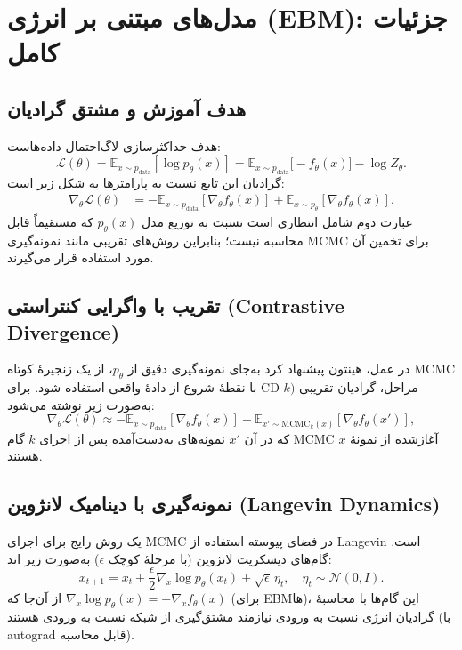


\section{مدل‌های مبتنی بر انرژی (EBM): جزئیات کامل}

\subsection{هدف آموزش و مشتق گرادیان}
هدف حداکثرسازی لاگ‌احتمال داده‌هاست:
\begin{equation}
\mathcal{L}(\theta)=\mathbb{E}_{x\sim p_{\text{data}}}[\log p_{\theta}(x)] = \mathbb{E}_{x\sim p_{\text{data}}}\big[-f_{\theta}(x)\big] - \log Z_{\theta}.
\end{equation}
گرادیان این تابع نسبت به پارامترها به شکل زیر است:
\begin{align}
\nabla_{\theta} \mathcal{L}(\theta) &= -\mathbb{E}_{x\sim p_{\text{data}}}[\nabla_{\theta} f_{\theta}(x)] + \mathbb{E}_{x\sim p_{\theta}}[\nabla_{\theta} f_{\theta}(x)].
\end{align}
عبارت دوم شامل انتظاری است نسبت به توزیع مدل \(p_{\theta}(x)\) که مستقیماً قابل محاسبه نیست؛ بنابراین روش‌های تقریبی مانند نمونه‌گیری MCMC برای تخمین آن مورد استفاده قرار می‌گیرند.

\subsection{تقریب با واگرایی کنتراستی (Contrastive Divergence)}
در عمل، هینتون پیشنهاد کرد به‌جای نمونه‌گیری دقیق از \(p_{\theta}\)، از یک زنجیرهٔ کوتاه MCMC با نقطهٔ شروع از دادهٔ واقعی استفاده شود. برای CD-\(k)\) مراحل، گرادیان تقریبی به‌صورت زیر نوشته می‌شود:
\begin{equation}
\nabla_{\theta} \mathcal{L}(\theta) \approx -\mathbb{E}_{x\sim p_{\text{data}}}[\nabla_{\theta} f_{\theta}(x)] + \mathbb{E}_{x'\sim \text{MCMC}_k(x)}[\nabla_{\theta} f_{\theta}(x')],
\end{equation}
که در آن \(x'\) نمونه‌های به‌دست‌آمده پس از اجرای \(k\) گام MCMC آغازشده از نمونهٔ \(x\) هستند.

\subsection{نمونه‌گیری با دینامیک لانژوین (Langevin Dynamics)}
یک روش رایج برای اجرای MCMC در فضای پیوسته استفاده از Langevin است. گام‌های دیسکریت لانژوین (با مرحلهٔ کوچک \(\epsilon\)) به‌صورت زیر اند:
\begin{equation}
x_{t+1} = x_t + \frac{\epsilon}{2} \nabla_x \log p_{\theta}(x_t) + \sqrt{\epsilon}\,\eta_t, \quad \eta_t \sim \mathcal{N}(0, I).
\end{equation}
از آن‌جا که \(\nabla_x \log p_{\theta}(x) = -\nabla_x f_{\theta}(x)\) (برای EBMها)، این گام‌ها با محاسبهٔ گرادیان انرژی نسبت به ورودی نیازمند مشتق‌گیری از شبکه نسبت به ورودی هستند (با autograd قابل محاسبه).

